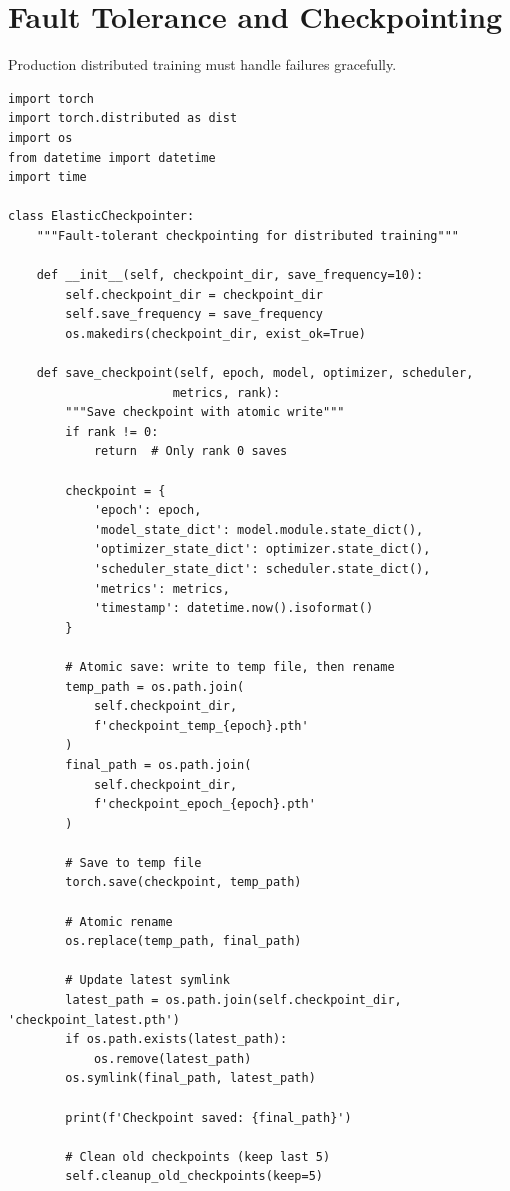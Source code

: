 \section{Fault Tolerance and Checkpointing}

Production distributed training must handle failures gracefully.

\begin{lstlisting}[style=python, caption=Fault-tolerant training with elastic checkpointing]
import torch
import torch.distributed as dist
import os
from datetime import datetime
import time

class ElasticCheckpointer:
    """Fault-tolerant checkpointing for distributed training"""

    def __init__(self, checkpoint_dir, save_frequency=10):
        self.checkpoint_dir = checkpoint_dir
        self.save_frequency = save_frequency
        os.makedirs(checkpoint_dir, exist_ok=True)

    def save_checkpoint(self, epoch, model, optimizer, scheduler,
                       metrics, rank):
        """Save checkpoint with atomic write"""
        if rank != 0:
            return  # Only rank 0 saves

        checkpoint = {
            'epoch': epoch,
            'model_state_dict': model.module.state_dict(),
            'optimizer_state_dict': optimizer.state_dict(),
            'scheduler_state_dict': scheduler.state_dict(),
            'metrics': metrics,
            'timestamp': datetime.now().isoformat()
        }

        # Atomic save: write to temp file, then rename
        temp_path = os.path.join(
            self.checkpoint_dir,
            f'checkpoint_temp_{epoch}.pth'
        )
        final_path = os.path.join(
            self.checkpoint_dir,
            f'checkpoint_epoch_{epoch}.pth'
        )

        # Save to temp file
        torch.save(checkpoint, temp_path)

        # Atomic rename
        os.replace(temp_path, final_path)

        # Update latest symlink
        latest_path = os.path.join(self.checkpoint_dir, 'checkpoint_latest.pth')
        if os.path.exists(latest_path):
            os.remove(latest_path)
        os.symlink(final_path, latest_path)

        print(f'Checkpoint saved: {final_path}')

        # Clean old checkpoints (keep last 5)
        self.cleanup_old_checkpoints(keep=5)


\end{lstlisting}
